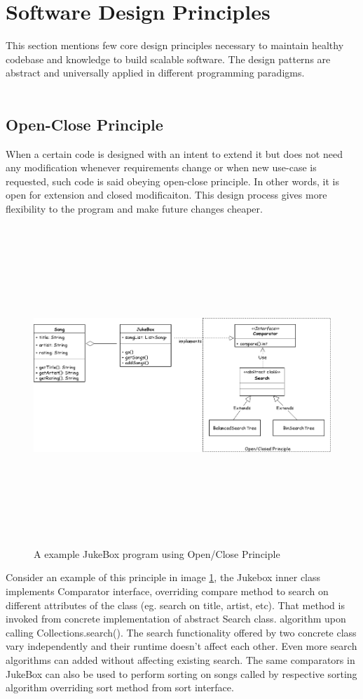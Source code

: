 \section{Software Design Principles}
This section mentions few core design principles necessary to maintain healthy codebase and knowledge to
build scalable software. The design patterns are abstract and universally applied in different programming paradigms.
\\
\\
\subsection{Open-Close Principle}
When a certain code is designed with an intent to extend it but does not need any modification
whenever requirements change or when new use-case is requested, such code is said obeying open-close
principle. In other words, it is open for extension and closed modificaiton. This design process gives
more flexibility to the program and make future changes cheaper.

\begin{figure}[h!]
  \centering
  \includegraphics[width=15cm,height=12cm,keepaspectratio]{../media/crawler/opencloseprinciple.png}
  \caption{A example JukeBox program using Open/Close Principle}
  \label{fig:jukebox}
\end{figure}

\noindent
Consider an example of this principle in image \ref{fig:jukebox}, the Jukebox inner class implements Comparator interface, overriding compare method to search on different attributes of the class (eg. search on title, artist, etc). That method is invoked from concrete implementation of abstract Search class.
algorithm upon calling Collections.search(). The search functionality offered by two concrete class vary
independently and their runtime doesn't affect each other. Even more search algorithms can added without
affecting existing search. The same comparators in JukeBox can also be used to perform sorting on songs
called by respective sorting algorithm overriding sort method from sort interface.

